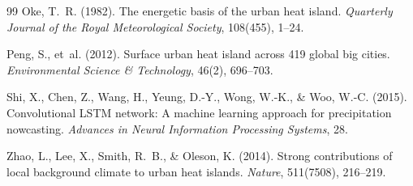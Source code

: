 \documentclass{article}
\begin{document}
\begin{thebibliography}{99}
Oke, T.~R. (1982).
The energetic basis of the urban heat island.
\textit{Quarterly Journal of the Royal Meteorological Society}, 108(455),
1--24.

Peng, S., et~al. (2012).
Surface urban heat island across 419 global big cities.
\textit{Environmental Science \& Technology}, 46(2), 696--703.

Shi, X., Chen, Z., Wang, H., Yeung, D.-Y., Wong, W.-K., \& Woo, W.-C. (2015).
Convolutional LSTM network: A machine learning approach for precipitation
nowcasting.
\textit{Advances in Neural Information Processing Systems}, 28.

Zhao, L., Lee, X., Smith, R.~B., \& Oleson, K. (2014).
Strong contributions of local background climate to urban heat islands.
\textit{Nature}, 511(7508), 216--219.

\end{thebibliography}
\end{document}
